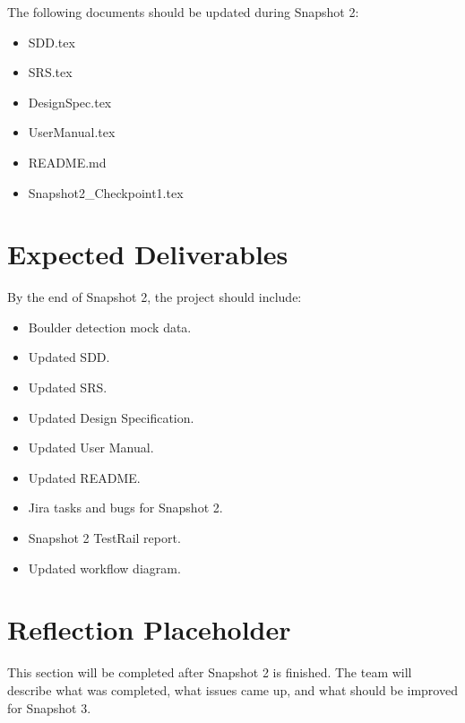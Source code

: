 \documentclass[12pt]{article}
\begin{document}
The following documents should be updated during Snapshot 2:

\begin{itemize}
    \item SDD.tex
    \item SRS.tex
    \item DesignSpec.tex
    \item UserManual.tex
    \item README.md
    \item Snapshot2\_Checkpoint1.tex
\end{itemize}

\section{Expected Deliverables}

By the end of Snapshot 2, the project should include:

\begin{itemize}
    \item Boulder detection mock data.
    \item Updated SDD.
    \item Updated SRS.
    \item Updated Design Specification.
    \item Updated User Manual.
    \item Updated README.
    \item Jira tasks and bugs for Snapshot 2.
    \item Snapshot 2 TestRail report.
    \item Updated workflow diagram.
\end{itemize}

\section{Reflection Placeholder}

This section will be completed after Snapshot 2 is finished. The team will describe what was completed, what issues came up, and what should be improved for Snapshot 3.
\end{document}
